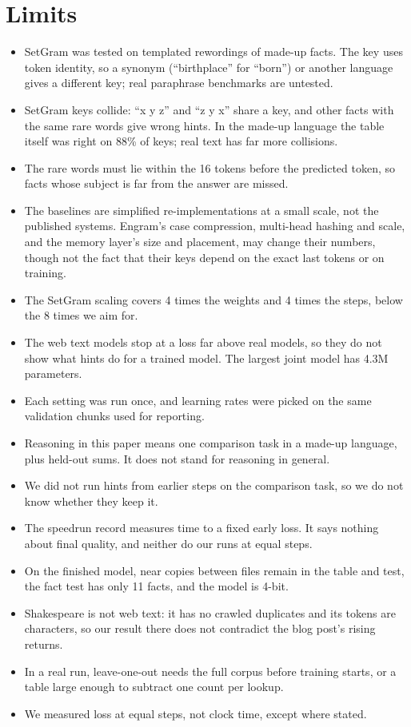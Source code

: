 \documentclass[11pt]{article}
\begin{document}
\section{Limits}
\begin{itemize}
\item SetGram was tested on templated rewordings of made-up facts. The key uses token identity, so a synonym (``birthplace'' for ``born'') or another language gives a different key; real paraphrase benchmarks are untested.
\item SetGram keys collide: ``x y z'' and ``z y x'' share a key, and other facts with the same rare words give wrong hints. In the made-up language the table itself was right on 88\% of keys; real text has far more collisions.
\item The rare words must lie within the 16 tokens before the predicted token, so facts whose subject is far from the answer are missed.
\item The baselines are simplified re-implementations at a small scale, not the published systems. Engram's case compression, multi-head hashing and scale, and the memory layer's size and placement, may change their numbers, though not the fact that their keys depend on the exact last tokens or on training.
\item The SetGram scaling covers 4 times the weights and 4 times the steps, below the 8 times we aim for.
\item The web text models stop at a loss far above real models, so they do not show what hints do for a trained model. The largest joint model has 4.3M parameters.
\item Each setting was run once, and learning rates were picked on the same validation chunks used for reporting.
\item Reasoning in this paper means one comparison task in a made-up language, plus held-out sums. It does not stand for reasoning in general.
\item We did not run hints from earlier steps on the comparison task, so we do not know whether they keep it.
\item The speedrun record measures time to a fixed early loss. It says nothing about final quality, and neither do our runs at equal steps.
\item On the finished model, near copies between files remain in the table and test, the fact test has only 11 facts, and the model is 4-bit.
\item Shakespeare is not web text: it has no crawled duplicates and its tokens are characters, so our result there does not contradict the blog post's rising returns.
\item In a real run, leave-one-out needs the full corpus before training starts, or a table large enough to subtract one count per lookup.
\item We measured loss at equal steps, not clock time, except where stated.
\end{itemize}
\end{document}

